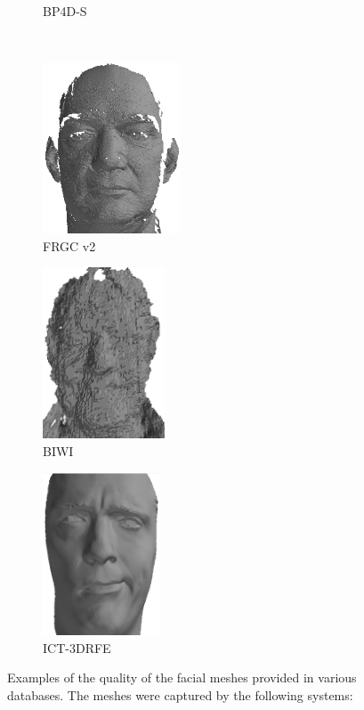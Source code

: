 \begin{figure}[ht]
\begin{subfigure}[b]{0.3\textwidth}
		\caption{BP4D-S~\cite{Zhang:2014id}}\label{fig:db_examples_bp4d}
	\end{subfigure} \\
	\begin{subfigure}[b]{0.3\textwidth}
		\centering
		\includegraphics[height=2in]{background/images/frgc}
		\caption{FRGC v2~\cite{phillips2005overview}}\label{fig:db_examples_frgc}
	\end{subfigure}
	\begin{subfigure}[b]{0.3\textwidth}
		\centering
		\includegraphics[height=2in]{background/images/biwi}
		\caption{BIWI~\cite{fanelli2013random}}\label{fig:db_examples_biwi}
	\end{subfigure}
	\begin{subfigure}[b]{0.3\textwidth}
		\centering
		\includegraphics[height=1.9in]{background/images/ict}
		\caption{ICT-3DRFE~\cite{stratou2012exploring}}\label{fig:db_examples_ict}
	\end{subfigure}
	\caption{Examples of the quality of the facial meshes provided in various
	         databases. The meshes were captured by the following systems:
}
\end{figure}
